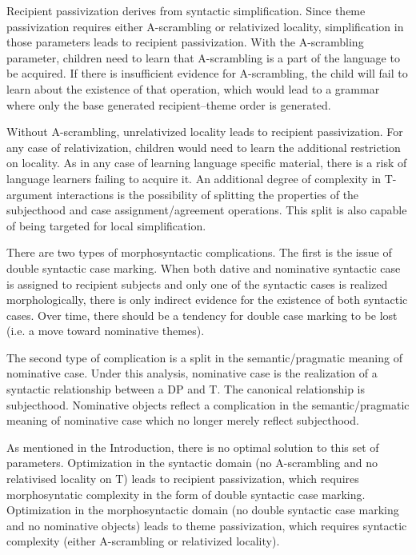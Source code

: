 Recipient passivization derives from syntactic simplification. Since theme passivization requires either A-scrambling or relativized locality, simplification in those parameters leads to recipient passivization. With the A-scrambling parameter, children need to learn that A-scrambling is a part of the language to be acquired. If there is insufficient evidence for A-scrambling, the child will fail to learn about the existence of that operation, which would lead to a grammar where only the base generated recipient--theme order is generated. 

Without A-scrambling, unrelativized locality leads to recipient passivization. For any case of relativization, children would need to learn the additional restriction on locality. As in any case of learning language specific material, there is a risk of language learners failing to acquire it. An additional degree of complexity in T-argument interactions is the possibility of splitting the properties of the subjecthood and case assignment/agreement operations. This split is also capable of being targeted for local simplification.

There are two types of morphosyntactic complications. The first is the issue of double syntactic case marking. When both dative and nominative syntactic case is assigned to recipient subjects and only one of the syntactic cases is realized morphologically, there is only indirect evidence for the existence of both syntactic cases. Over time, there should be a tendency for double case marking to be lost (i.e. a move toward nominative themes).

The second type of complication is a split in the semantic/pragmatic meaning of nominative case. Under this analysis, nominative case is the realization of a syntactic relationship between a DP and T. The canonical relationship is subjecthood. Nominative objects reflect a complication in the semantic/pragmatic meaning of nominative case which no longer merely reflect subjecthood. 

As mentioned in the Introduction, there is no optimal solution to this set of parameters. Optimization in the syntactic domain (no A-scrambling and no relativised locality on T) leads to recipient passivization, which requires morphosyntatic complexity in the form of double syntactic case marking. Optimization in the morphosyntactic domain (no double syntactic case marking and no nominative objects) leads to theme passivization, which requires syntactic complexity (either A-scrambling or relativized locality). 

